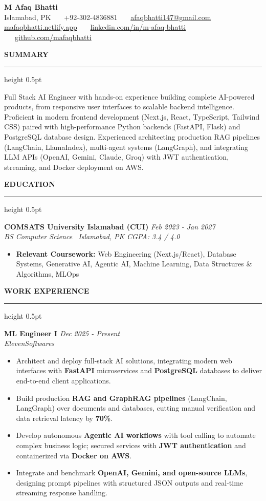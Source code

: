 \documentclass[10pt,letterpaper]{article}
\newcommand{\resumesection}[1]{%
  \vspace{3.5pt}%
  {\fontsize{10.5pt}{12pt}\selectfont\textbf{\MakeUppercase{#1}}}%
  \vspace{1.5pt}%
  \hrule height 0.5pt%
  \vspace{2.5pt}%
}
\begin{document}
\begin{center}
  {\fontsize{18pt}{20pt}\selectfont\textbf{M Afaq Bhatti}}\\[3pt]
  {\fontsize{9pt}{11pt}\selectfont Islamabad, PK \ \textbar\ \ +92-302-4836881 \ \textbar\ \ \href{mailto:afaqbhatti147@gmail.com}{afaqbhatti147@gmail.com}}\\[2pt]
  {\fontsize{9pt}{11pt}\selectfont \href{https://mafaqbhatti.netlify.app/}{mafaqbhatti.netlify.app} \ \textbar\ \ \href{https://www.linkedin.com/in/m-afaq-bhatti/}{linkedin.com/in/m-afaq-bhatti} \ \textbar\ \ \href{https://github.com/mafaqbhatti}{github.com/mafaqbhatti}}
\end{center}
\vspace{-6pt}

\resumesection{Summary}
Full Stack AI Engineer with hands-on experience building complete AI-powered products, from responsive user interfaces to scalable backend intelligence. Proficient in modern frontend development (Next.js, React, TypeScript, Tailwind CSS) paired with high-performance Python backends (FastAPI, Flask) and PostgreSQL database design. Experienced architecting production RAG pipelines (LangChain, LlamaIndex), multi-agent systems (LangGraph), and integrating LLM APIs (OpenAI, Gemini, Claude, Groq) with JWT authentication, streaming, and Docker deployment on AWS.

\resumesection{Education}
\noindent\textbf{COMSATS University Islamabad (CUI)} \hfill \textit{Feb 2023 - Jan 2027} \\
\textit{BS Computer Science \textbar\ Islamabad, PK} \hfill \textit{CGPA: 3.4 / 4.0}
\begin{itemize}
  \item \textbf{Relevant Coursework:} Web Engineering (Next.js/React), Database Systems, Generative AI, Agentic AI, Machine Learning, Data Structures \& Algorithms, MLOps
\end{itemize}

\resumesection{Work Experience}
\noindent\textbf{ML Engineer I} \hfill \textit{Dec 2025 - Present} \\
\textit{ElevenSoftwares}
\begin{itemize}
  \item Architect and deploy full-stack AI solutions, integrating modern web interfaces with \textbf{FastAPI} microservices and \textbf{PostgreSQL} databases to deliver end-to-end client applications.
  \item Build production \textbf{RAG and GraphRAG pipelines} (LangChain, LangGraph) over documents and databases, cutting manual verification and data retrieval latency by \textbf{70\%}.
  \item Develop autonomous \textbf{Agentic AI workflows} with tool calling to automate complex business logic; secured services with \textbf{JWT authentication} and containerized via \textbf{Docker on AWS}.
  \item Integrate and benchmark \textbf{OpenAI, Gemini, and open-source LLMs}, designing prompt pipelines with structured JSON outputs and real-time streaming response handling.
\end{itemize}
\end{document}

